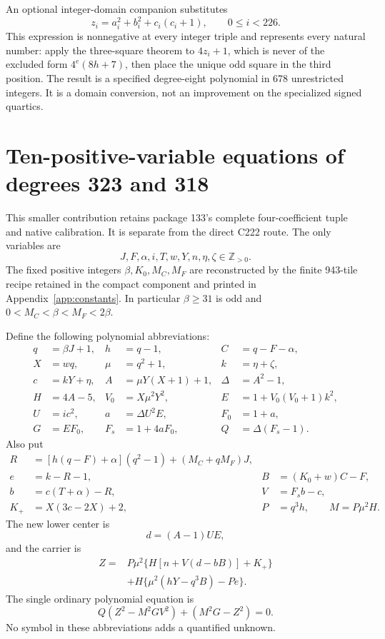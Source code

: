 \documentclass[11pt,letterpaper]{article}
\theoremstyle{definition}\newtheorem{definition}[theorem]{Definition}
\theoremstyle{remark}\newtheorem{remark}[theorem]{Remark}
\newcommand{\Z}{\mathbb Z}\newcommand{\N}{\mathbb N}
\begin{document}
An optional integer-domain companion substitutes
\[
 z_i=a_i^2+b_i^2+c_i(c_i+1),\qquad 0\le i<226.
\]
This expression is nonnegative at every integer triple and represents
every natural number: apply the three-square theorem to \(4z_i+1\),
which is never of the excluded form \(4^e(8h+7)\), then place the unique
odd square in the third position. The result is a specified degree-eight
polynomial in 678 unrestricted integers. It is a domain conversion, not
an improvement on the specialized signed quartics.

\section{Ten-positive-variable equations of degrees 323 and 318}
\label{sec:compact}

This smaller contribution retains package 133's complete four-coefficient
tuple and native calibration. It is separate from the direct C222 route.
The only variables are
\[
 J,F,\alpha,i,T,w,Y,n,\eta,\zeta\in\Z_{>0}.
\]
The fixed positive integers \(\beta,K_0,M_C,M_F\) are reconstructed by
the finite 943-tile recipe retained in the compact component and printed
in Appendix~\ref{app:constants}. In particular \(\beta\ge31\) is odd
and \(0<M_C<\beta<M_F<2\beta\).

Define the following polynomial abbreviations:
\begin{align*}
 q&=\beta J+1, & h&=q-1, & C&=q-F-\alpha,\\
 X&=wq, & \mu&=q^2+1, & k&=\eta+\zeta,\\
 c&=kY+\eta, & A&=\mu Y(X+1)+1, & \Delta&=A^2-1,\\
 H&=4A-5, & V_0&=X\mu^2Y^2, & E&=1+V_0(V_0+1)k^2,\\
 U&=ic^2, & a&=\Delta U^2E, & F_0&=1+a,\\
 G&=EF_0, & F_s&=1+4aF_0, & Q&=\Delta(F_s-1).
\end{align*}
Also put
\begin{align*}
 R&=[h(q-F)+\alpha](q^2-1)+(M_C+qM_F)J,\\
 e&=k-R-1, & B&=(K_0+w)C-F,\\
 b&=c(T+\alpha)-R, & V&=F_s b-c,\\
 K_+&=X(3c-2X)+2, & P&=q^3h,\qquad M=P\mu^2H.
\end{align*}
The new lower center is
\[
 d=(A-1)UE,
\]
and the carrier is
\begin{align*}
 Z={}&P\mu^2\{H[n+V(d-bB)]+K_+\}\\
     &+H\{\mu^2(hY-q^3B)-Pe\}.
\end{align*}
The single ordinary polynomial equation is
\begin{equation}\label{eq:compact}
 \boxed{Q(Z^2-M^2GV^2)+(M^2G-Z^2)=0.}
\end{equation}
No symbol in these abbreviations adds a quantified unknown.
\end{document}
